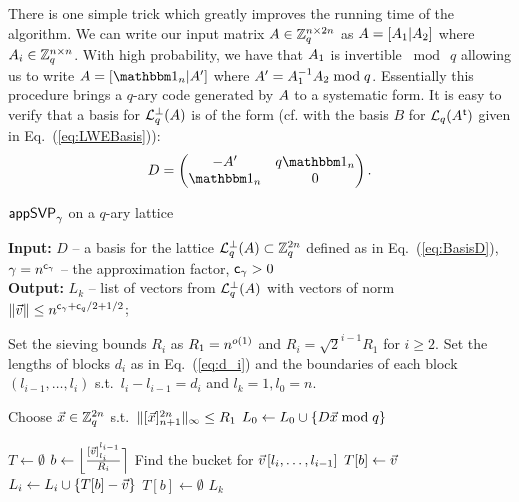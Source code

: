 There is one simple trick which greatly improves the running time of the algorithm. We can write our input matrix $A \in {{\mathbb Z}}_q^{n \times 2n}$ as $A = [A_1 | A_2]$ where $A_i \in {{\mathbb Z}}_q^{n \times n}$. With high probability, we have that $A_1$ is invertible $\bmod~q$ allowing us to write $\AMat = [\Id_n | \AMat']$ where $A' = A_1^{-1} A_2 \bmod q$. Essentially this procedure brings a $q$-ary code generated by $A$ to a systematic form. It is easy to verify that a basis for $\mathcal{L}_q^{\perp}(A)$ is of the form (cf. with the basis $B$ for $\mathcal{L}_q(A\mkern0.7mu^{\mathsf{ t}})$ given in Eq.~(\ref{eq:LWEBasis})):
\begin{equation}\label{eq:BasisD}
	\DMat = \begin{pmatrix}
	-\AMat' & q\Id_n \\
	\Id_{n} & 0
	\end{pmatrix}.
\end{equation}


\begin{algorithm}[t]
	\caption{$\textsf{appSVP}_{\gamma}$ on a $q$-ary lattice}
	\label{alg:ApproxSVP}
	\textbf{Input:} $D$ -- a basis for the lattice $\mathcal{L}_q^{\perp}(A) \subset {{\mathbb Z}}_q^{2n}$ defined as in Eq.~(\ref{eq:BasisD}), $\gamma = n^{\mathsf{c}_{\gamma}}$ -- the approximation factor, $\mathsf{c}_{\gamma}>0$ \\
	\textbf{Output:} $L_k$ -- list of vectors from $\mathcal{L}_q^{\perp}(A)$ with vectors of norm $\| \vvec \| \leq n^{\cg+\cq/2+1/2}$;
	
	\begin{algorithmic}[1]
		
		\State Set the sieving bounds $R_i$ as $R_1 = n^{o(1)}$ and $R_i = \sqrt{2}^{i-1} R_1$ for $i \geq 2$.
		\State Set the lengths of blocks $d_i$ as in Eq.~(\ref{eq:d_i}) and the boundaries of each block $(l_{i-1}, \ldots, l_i)$ s.t.\ $l_{i}-{l_{i-1}} = d_i$ and $l_k = 1, l_0 = n$.
		
		\Repeat {}
		\State Choose $\vec x \in {{\mathbb Z}}_q^{2n}$ s.t.\ $\| [\vec x]_{n+1}^{2n} \|_{\infty} \leq R_1$
		\State $L_0 \gets L_0 \mathbin{\cup} \{D\vec x \bmod q\} $
		
		\State $T \gets \emptyset$ 
		 \label{algline:ForLoop1}
			 \label{algline:ForLoop2}
				\State $b \gets \Big\lfloor \frac{[\vvec]_{l_i}^{l_{i-1}}}{R_i} \Big\rceil$ \Comment Find the bucket for $\vvec\mkern2mu[l_i, \ldots, l_{i-1}]$
					\State $T[b] \gets \vvec$
				\Else
					\State $L_{i} \gets L_{i} \union \{T[b] - \vvec \}$
					\State $T[b] \gets \emptyset$
				\EndIf
			\EndFor
		\EndFor
		\State \Return $L_k$
	\end{algorithmic}
	
	\vspace{10pt}
	
\end{algorithm}

